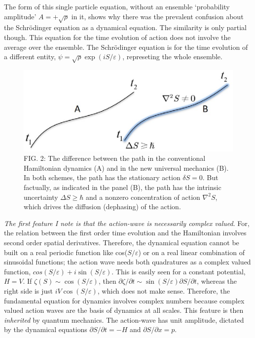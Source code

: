The form of this single particle equation, without an ensemble `probability amplitude'
$A = + \sqrt{\rho}$ in it, shows why there was the prevalent confusion about the Schr\"{o}dinger equation
as a dynamical equation. The similarity is only partial though. This equation for the
time evolution of action does not involve the average over the ensemble. The Schr\"{o}dinger
equation is for the time evolution of a different entity, $\psi = \sqrt{\rho} \exp(iS/\varepsilon)$, represeting the
whole ensemble.
\begin{figure}[H]
\centering
\includegraphics[scale=0.65]{src/images/chap27/2.eps}
\caption{FIG. 2: The difference between the path in the conventional Hamiltonian dynamics (A) and in
the new universal mechanics (B). In both schemes, the path has the stationary action $\delta S = 0$.
But factually, as indicated in the panel (B), the path has the intrinsic uncertainty $\Delta S \geq \hbar$ and a
nonzero concentration of action $\nabla^2 S$, which drives the diffusion (dephasing) of the action.}
\end{figure}

\textit{The first feature I note is that the action-wave is necessarily complex valued}. For, the relation between the first order time evolution and the Hamiltonian involves second order spatial
derivatives. Therefore, the dynamical equation cannot be built on a real periodic function
like cos($S/\varepsilon$) or on a real linear combination of sinusoidal functions; the action wave needs
both quadratures as a complex valued function, $cos(S/\varepsilon) + i \sin(S/\varepsilon)$. This is easily seen for
a constant potential, $H = V$. If $\zeta(S) \sim \cos (S/\varepsilon)$, then $\partial \zeta/\partial t \sim \sin (S/\varepsilon) \partial S/\partial t$, whereas
the right side is just $iV \cos (S/\varepsilon)$, which does not make sense. Therefore, the fundamental
equation for dynamics involves complex numbers because complex valued action waves are
the basis of dynamics at all scales. This feature is then \textit{inherited} by quantum mechanics.
The action-wave has unit amplitude, dictated by the dynamical equations $\partial S/\partial t = -H$ and
$\partial S/\partial x = p$.

